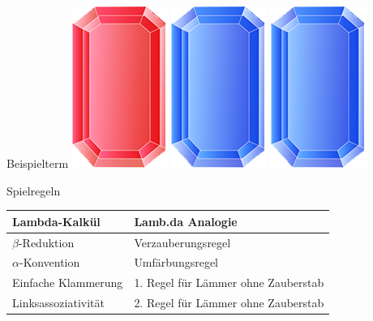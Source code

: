 \documentclass[18pt]{beamer}
\begin{document}
\begin{frame}{Beispielterm}
	\hspace{0.5cm} \includegraphics[scale=0.5]{pictures/gem_red} \hspace{0.05cm} \hspace{1.7cm} \includegraphics[scale=0.5]{pictures/gem_blue} \hspace{0.05cm} \includegraphics[scale=0.5]{pictures/gem_blue} \\
\end{frame}

\begin{frame}{Spielregeln}
	\centering
	\begin{tabular}[h]{l | l}
	Lambda-Kalkül & Lamb.da Analogie \\
	\hline
	$\beta$-Reduktion & Verzauberungsregel \\
	$\alpha$-Konvention & Umfärbungsregel \\
	Einfache Klammerung & 1. Regel für Lämmer ohne Zauberstab \\
	Linksassoziativität & 2. Regel für Lämmer ohne Zauberstab
	\end{tabular}
\end{frame}
\end{document}
